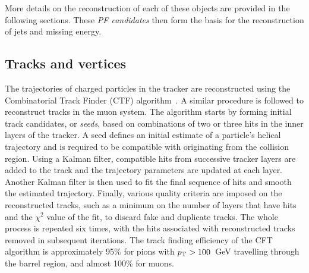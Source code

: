 More details on the reconstruction of each of these objects are provided in the 
following sections. These \textit{PF candidates} then form the basis for the 
reconstruction of jets and missing energy.


\subsection{Tracks and vertices}


The trajectories of charged particles in the tracker are reconstructed using 
the Combinatorial Track Finder (CTF) algorithm~\cite{track-vertex}. 
A similar procedure is followed to reconstruct tracks in the muon system.
The algorithm starts by forming initial track candidates, or \textit{seeds}, 
based on 
combinations of two or three hits in the inner layers of the tracker. A seed 
defines an initial estimate of a particle's helical trajectory and is required 
to be compatible with originating from the collision region. Using a Kalman 
filter, compatible hits from successive tracker layers are added to the track 
and the trajectory parameters are updated at each layer. Another Kalman filter 
is then used to fit the final sequence of hits and smooth the estimated 
trajectory. 
Finally, various quality criteria are imposed on the reconstructed 
tracks, such as a minimum on the number of layers that have hits and the 
$\chi^2$ value of the fit, to discard fake and duplicate tracks. The whole 
process is repeated six times, with the hits associated with reconstructed 
tracks removed in subsequent iterations. The track finding efficiency of the 
CFT algorithm is approximately 95\% for pions with ${p_{\text T}}>100$~GeV travelling 
through the barrel region, and almost 100\% for muons.


